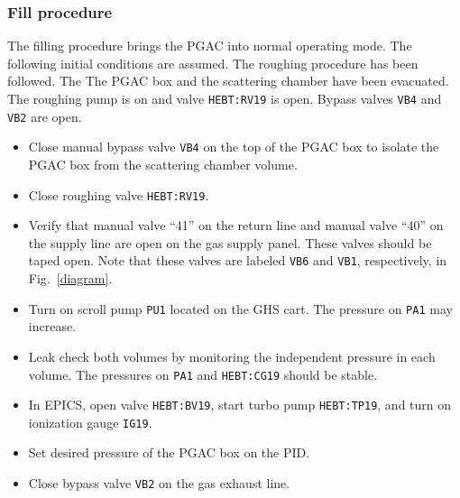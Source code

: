 \subsubsection{Fill procedure}
The filling procedure brings the PGAC into normal operating mode. The following initial conditions are assumed. The roughing procedure has been followed. The The PGAC box and the scattering chamber have been evacuated. The roughing pump is on and valve \texttt{HEBT:RV19} is open. Bypass valves \texttt{VB4} and \texttt{VB2} are open. %
\begin{itemize}
\setlength{\itemsep}{0pt}
\setlength{\parskip}{0pt}
\setlength{\parsep}{0pt}
\item %
Close manual bypass valve \texttt{VB4} on the top of the PGAC box to isolate the PGAC box from the scattering chamber volume.
\item Close roughing valve \texttt{HEBT:RV19}.
\item Verify that manual valve ``41'' on the return line and manual valve  ``40'' on the supply line are open on the gas supply panel. These valves should be taped open.  Note that these valves are labeled \texttt{VB6} and \texttt{VB1}, respectively, in Fig.~\ref{diagram}.
\item Turn on scroll pump \texttt{PU1} located on the GHS cart. %
The pressure on \texttt{PA1} may increase.

\item Leak check both volumes by monitoring the independent pressure in each volume.  The pressures  on  \texttt{PA1} and \texttt{HEBT:CG19} should be stable.

\item In EPICS, open valve \texttt{HEBT:BV19},  start turbo pump \texttt{HEBT:TP19}, and turn on ionization gauge \texttt{IG19}.
\item Set desired pressure of the PGAC box on the PID.

\item Close bypass valve \texttt{VB2} on the gas exhaust line. 


\end{itemize}
